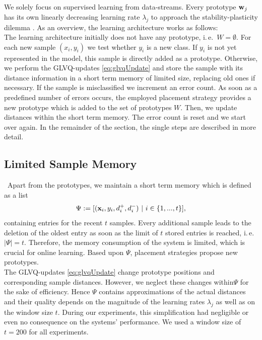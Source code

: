 \documentclass[conference]{IEEEtran}
\begin{document}
We solely focus on supervised learning from data-streams. Every prototype $\mathbf{w}_j$ has its own linearly decreasing learning rate $\lambda_j$ to approach the stability-plasticity dilemma \cite{PN0805}.
As an overview, the learning architecture works as follows:\\
The learning architecture initially does not have any prototype, i.\,e.\ $W=\emptyset$.
For each new sample $(x_i,y_i)$ we test whether $y_i$ is a new class.
If $y_i$ is not yet represented in the model, this sample is directly added as a prototype.
Otherwise, we
perform the GLVQ-updates \eqref{eq:glvqUpdate} and store the sample with its distance information in a short term memory of limited size, replacing old ones if necessary. 
If the sample is misclassified we increment an error count. As soon as a predefined number of errors occurs, the employed placement strategy provides a new prototype which 
is added to the set of prototypes $W$. Then, we update distances within the short term memory.
The error count is reset and we start over again.
In the remainder of the section, the single steps are described in more detail. 
\subsection{Limited Sample Memory}\
Apart from the prototypes, we maintain a short term memory which is defined as a list
\begin{equation}\label{eq:Psi}
\Psi:= [ (\x_i,y_i,d^+_i,d^-_i) \ |\ i \in \{1,...,t\}],
\end{equation}
containing entries for the recent $t$ samples. Every additional sample leads to the deletion of the oldest entry as soon as the limit of $t$ stored entries is reached,
i.\,e.\ $|\Psi|=t$. Therefore, the memory consumption of the system is limited, which is crucial for online learning. 
Based upon $\Psi$, placement strategies propose new prototypes.\\
The GLVQ-updates \eqref{eq:glvqUpdate} change prototype positions and corresponding sample distances.  
However, we neglect these changes within$\Psi$ for the sake of efficiency. 
Hence $\Psi$ contains approximations of the actual distances and their quality depends on the magnitude of 
the learning rates $\lambda_j$ as well as on the window size $t$. During our experiments, this simplification had negligible 
or even no consequence on the systems' performance. We used a window size of $t=200$ for all experiments.
\end{document}
